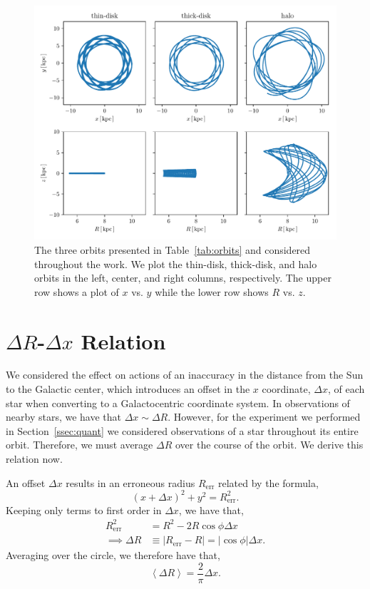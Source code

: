 \documentclass[twocolumn]{aastex62}
\newcommand{\abs}[1]{\left| #1 \right|}
\newcommand{\avg}[1]{\left< #1 \right>}
\newcommand{\beq}{\begin{equation}}
\newcommand{\eeq}{\end{equation}}
\begin{document}
\begin{figure}[htb!]
\begin{center}
\includegraphics[width=\textwidth]{fig/orbits.pdf}
\end{center}
\caption{The three orbits presented in Table~\ref{tab:orbits} and considered
throughout the work. We plot the thin-disk, thick-disk, and halo orbits in the
left, center, and right columns, respectively. The upper row shows a plot of
$x$ vs. $y$ while the lower row shows $R$ vs. $z$.}
\label{fig:plot_orbits}
\end{figure}

\section{$\Delta R$-$\Delta x$ Relation} \label{app:deltax}
We considered the effect on actions of an inaccuracy in the distance from the
Sun to the Galactic center, which introduces an offset in the $x$ coordinate,
$\Delta x$, of each star when converting to a Galactocentric coordinate
system. In observations of nearby stars, we have that $\Delta x \sim \Delta
R$. However, for the experiment we performed in Section~\ref{ssec:quant} we
considered observations of a star throughout its entire orbit. Therefore, we
must average $\Delta R$ over the course of the orbit. We derive this relation
now.

An offset $\Delta x$ results in an erroneous radius $R_{\text{err}}$ related by
the formula,
\beq
(x+\Delta x)^2 + y^2 = R_{\text{err}}^2\text{.}
\eeq
Keeping only terms to first order in $\Delta x$, we have that,
\beq
\begin{split}
R_{\text{err}}^2 &= R^2 - 2 R \cos{\phi} \Delta x \\
\implies \Delta R &\equiv \abs{R_{\text{err}} - R} 
        = \abs{\cos{\phi}} \Delta x\text{.}
\end{split}
\eeq
Averaging over the circle, we therefore have that,
\beq
\avg{\Delta R} = \frac{2}{\pi} \Delta x\text{.}
\eeq
\end{document}
